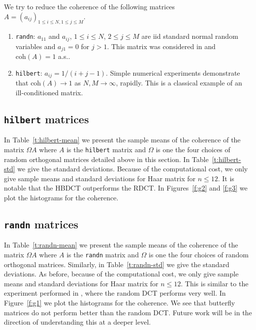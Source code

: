 We try to reduce the coherence of the following matrices $A = (a_{ij})_{1 \leq i \leq N, 1 \leq j \leq M}$.

\begin{enumerate}
\item {\tt randn}: $a_{11}$ and $a_{ij}$, $1 \leq i \leq N$, $2 \leq j \leq M$ are iid standard normal random variables and $a_{j1} = 0$ for $j > 1$.  This matrix was considered in \cite{Avron2010} and $\mathrm{coh}(A) = 1$ a.s..
\item {\tt hilbert}: $a_{ij} = 1/(i + j -1)$.  Simple numerical experiments  demonstrate that $\mathrm{coh}(A) \to 1$ as $N, M \to \infty$, rapidly.  This is a classical example of an ill-conditioned matrix.
\end{enumerate}

\subsection{{\tt hilbert} matrices}

In Table~\ref{t:hilbert-mean} we present the sample means of the coherence of the matrix $\Omega A$ where $A$ is the {\tt hilbert} matrix and $\Omega$ is one the four choices of random orthogonal matrices detailed above in this section.  In Table~\ref{t:hilbert-std} we give the standard deviations.  Because of the computational cost, we only give sample means and standard deviations for Haar matrix for $n \leq 12$. It is notable that the HBDCT outperforms the RDCT.  In Figures~\ref{f:g2} and \ref{f:g3} we plot the histograms for the coherence.

\subsection{{\tt randn} matrices}

In Table~\ref{t:randn-mean} we present the sample means of the coherence of the matrix $\Omega A$ where $A$ is the {\tt randn} matrix and $\Omega$ is one the four choices of random orthogonal matrices.  Similarly, in Table~\ref{t:randn-std} we give the standard deviations.  As before, because of the computational cost, we only give sample means and standard deviations for Haar matrix for $n \leq 12$. This is similar to the experiment performed in \cite{Avron2010}, where the random DCT performs very well. In Figure~\ref{f:g1} we plot the histograms for the coherence.  We see that butterfly matrices do not perform better than the random DCT.  Future work will be in the direction of understanding this at a deeper level.  

